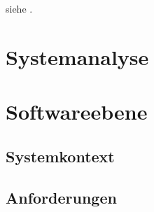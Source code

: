 

siehe  .


\section{Systemanalyse}\label{sec:systemanalyse}



\section{Softwareebene}\label{sec:softwareebene}


\subsection{Systemkontext}\label{subsec:systemkontext}


\subsection{Anforderungen}\label{subsec:anforderungen}


